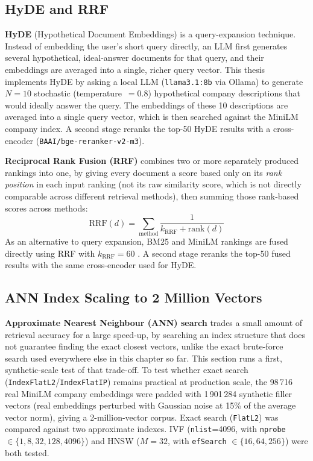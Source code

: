 \documentclass[a4paper,oneside,bibliography=totoc]{scrbook}
\begin{document}
\subsection{HyDE and RRF}
\label{sec:hyde}

\textbf{HyDE} (Hypothetical Document Embeddings) is a query-expansion technique. Instead of embedding the user's short query directly, an LLM first generates several hypothetical, ideal-answer documents for that query, and their embeddings are averaged into a single, richer query vector. This thesis implements HyDE by asking a local LLM (\texttt{llama3.1:8b} via Ollama) to generate $N=10$ stochastic (temperature~$=0.8$) hypothetical company descriptions that would ideally answer the query. The embeddings of these 10 descriptions are averaged into a single query vector, which is then searched against the MiniLM company index. A second stage reranks the top-50 HyDE results with a cross-encoder (\texttt{BAAI/bge-reranker-v2-m3}).

\label{sec:rrf}

\textbf{Reciprocal Rank Fusion (RRF)} combines two or more separately produced rankings into one, by giving every document a score based only on its \emph{rank position} in each input ranking (not its raw similarity score, which is not directly comparable across different retrieval methods), then summing those rank-based scores across methods:
\[
\mathrm{RRF}(d) = \sum_{\text{method}} \frac{1}{k_{\mathrm{RRF}} + \mathrm{rank}(d)}
\]
As an alternative to query expansion, BM25 and MiniLM rankings are fused directly using RRF with $k_{\mathrm{RRF}}=60$ \citep{cormack2009reciprocal}. A second stage reranks the top-50 fused results with the same cross-encoder used for HyDE.

\subsection{ANN Index Scaling to 2 Million Vectors}
\label{sec:ann_scaling}

\textbf{Approximate Nearest Neighbour (ANN) search} trades a small amount of retrieval accuracy for a large speed-up, by searching an index structure that does not guarantee finding the exact closest vectors, unlike the exact brute-force search used everywhere else in this chapter so far. This section runs a first, synthetic-scale test of that trade-off. To test whether exact search (\texttt{IndexFlatL2}/\texttt{IndexFlatIP}) remains practical at production scale, the 98\,716 real MiniLM company embeddings were padded with 1\,901\,284 synthetic filler vectors (real embeddings perturbed with Gaussian noise at 15\% of the average vector norm), giving a 2-million-vector corpus. Exact search (\texttt{FlatL2}) was compared against two approximate indexes. IVF (\texttt{nlist}=4096, with \texttt{nprobe} $\in \{1, 8, 32, 128, 4096\}$) and HNSW ($M=32$, with \texttt{efSearch} $\in \{16, 64, 256\}$) were both tested.
\end{document}

